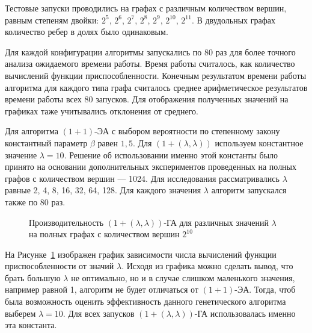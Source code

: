 \documentclass[times]{itmo-student-thesis}
\newcommand{\alglambda}{${(1 + (\lambda , \lambda))}$\xspace}
\newcommand{\alglambdaf}{${(1 + (\lambda , \lambda))}$-ГА\xspace}
\newcommand{\oea}{\mbox{$(1 + 1)$-ЭА}\xspace}
\newcommand{\ollga}{${(1 + (\lambda , \lambda))}$-ГА\xspace}
\begin{document}
Тестовые запуски проводились на графах с различным количеством вершин, равным степеням двойки: $2^5$, $2^6$, $2^7$, $2^8$, $2^9$, $2^{10}$, $2^{11}$.
В двудольных графах количество ребер в долях было одинаковым.

Для каждой конфигурации алгоритмы запускались по 80 раз для более точного анализа ожидаемого времени работы. Время работы считалось, как количество вычислений функции приспособленности. Конечным результатом времени работы алгоритма для каждого типа графа считалось среднее арифметическое результатов времени работы всех 80 запусков. Для отображения полученных значений на графиках таже учитывались отклонения от среднего.

Для алгоритма \oea с выбором вероятности по степенному закону константный параметр $\beta$ равен $1,5$. Для \alglambda используем константное значение $\lambda = 10$.
Решение об использовании именно этой константы было принято на основании дополнительных экспериментов проведенных на полных графов с количеством вершин --- 1024. Для исследования рассматривались $\lambda$ равные 2, 4, 8, 16, 32, 64, 128. Для каждого значения $\lambda$ алгоритм запускался также по 80 раз.

\begin{figure}[t!]
\caption{Производительность \ollga для различных значений $\lambda$ на полных графах с количеством вершин $2^{10}$}
\label{fig:lambda}
\end{figure}

На Рисунке~\ref{fig:lambda} изображен график зависимости числа вычислений функции приспособленности от значий $\lambda$. Исходя из графика можно сделать вывод, что брать большую $\lambda$ не оптимально, но и в случае слишком маленького значения, например равной 1, алгоритм не будет отличаться от \oea. Тогда, чтоб была возможность оценить эффективность данного генетического алгоритма выберем $\lambda = 10$. Для всех запусков \alglambdaf использовалась именно эта константа.
\end{document}
